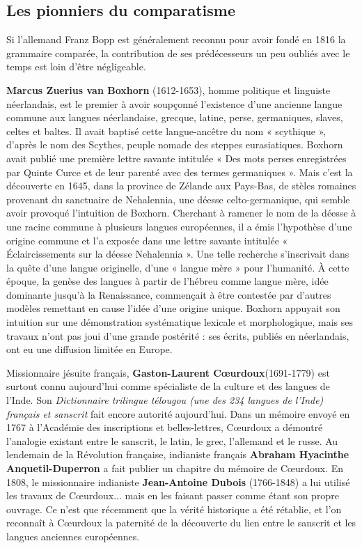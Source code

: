 \subsection{Les pionniers du comparatisme}
Si l’allemand Franz Bopp est généralement reconnu pour avoir fondé en 1816 la grammaire comparée, la contribution de ses prédécesseurs un peu oubliés avec le temps est loin d’être négligeable.

\textbf{Marcus Zuerius van Boxhorn} (1612-1653), homme politique et linguiste néerlandais, est le premier à avoir soupçonné l’existence d’une ancienne langue commune aux langues néerlandaise,
grecque, latine, perse, germaniques, slaves, celtes et baltes. Il avait baptisé cette langue-ancêtre du nom « scythique », d’après le nom des Scythes, peuple nomade des steppes eurasiatiques. Boxhorn avait publié une première lettre savante intitulée « Des mots perses enregistrées par Quinte Curce et de leur parenté avec des termes germaniques ». Mais c’est la découverte en 1645, dans la province de Zélande aux Pays-Bas, de stèles romaines provenant du sanctuaire de Nehalennia, une déesse celto-germanique, qui semble avoir provoqué l’intuition de Boxhorn. Cherchant à ramener le nom de la déesse à une racine commune à plusieurs langues européennes, il a émis l’hypothèse d’une origine commune et l’a exposée dans une lettre savante intitulée « Éclaircissements sur la déesse Nehalennia ». Une telle recherche s’inscrivait dans la quête d’une langue originelle, d’une « langue mère » pour l’humanité. À cette époque, la genèse des langues à partir de l’hébreu comme langue mère, idée dominante jusqu’à la Renaissance, commençait à être contestée par d’autres modèles remettant en cause l’idée d’une origine unique. Boxhorn appuyait son intuition sur une démonstration systématique lexicale et morphologique, mais ses travaux n’ont pas joui d’une grande postérité : ses écrits, publiés en néerlandais, ont eu une diffusion limitée en Europe.

Missionnaire jésuite français, \textbf{Gaston-Laurent Cœurdoux}(1691-1779) est surtout connu aujourd’hui comme spécialiste de la culture et des langues de l’Inde. Son \textit{Dictionnaire trilingue télougou (une des 234 langues de l’Inde) français et sanscrit} fait encore autorité aujourd’hui. Dans un mémoire envoyé en 1767 à l’Académie des inscriptions et belles-lettres, Cœurdoux a démontré l’analogie existant entre le sanscrit, le latin, le grec, l’allemand et le russe. Au lendemain de la Révolution française, indianiste français \textbf{Abraham Hyacinthe Anquetil-Duperron} a fait publier un chapitre du mémoire de Cœurdoux. En 1808, le missionnaire indianiste \textbf{Jean-Antoine Dubois} (1766-1848) a lui utilisé les travaux de Cœurdoux... mais en les faisant passer comme étant son propre ouvrage. Ce n’est que récemment que la vérité historique a été rétablie, et l’on reconnaît à Cœurdoux la paternité de la découverte du lien entre le sanscrit et les langues anciennes européennes.

